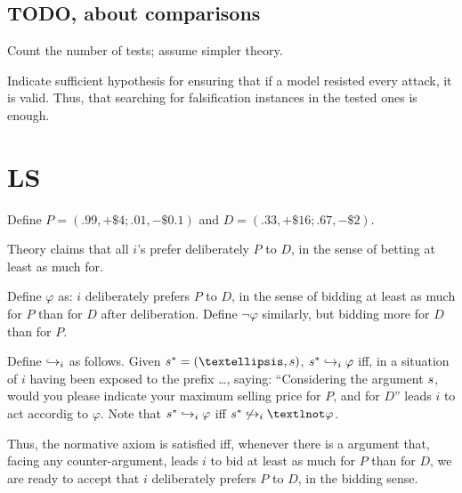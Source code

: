 \documentclass[version=last, pagesize, twoside=off, bibliography=totoc, DIV=calc, fontsize=12pt, a4paper, french, english]{scrartcl}
\renewcommand{\phi}{\varphi}%
\begin{document}
\subsection{TODO, about comparisons}
Count the number of tests; assume simpler theory.

Indicate sufficient hypothesis for ensuring that if a model resisted every attack, it is valid. Thus, that searching for falsification instances in the tested ones is enough.

\section{LS}
%
%
%
%
%
%
Define $P = (.99, +\$4; .01, −\$0.1)$ and $D = (.33, +\$16; .67, −\$2)$.

Theory claims that all $i$’s prefer deliberately $P$ to $D$, in the sense of betting at least as much for.

Define $\phi$ as: $i$ deliberately prefers $P$ to $D$, in the sense of bidding at least as much for $P$ than for $D$ after deliberation. Define $¬\phi$ similarly, but bidding more for $D$ than for $P$. 

Define $\hookrightarrow_i$ as follows. Given $\hist = (…, \ar)$, $\hist \ileadstost \phi$ iff, in a situation of $i$ having been exposed to the prefix …, saying: “Considering the argument $\ar$, would you please indicate your maximum selling price for $P$, and for $D$” leads $i$ to act accordig to $\phi$. Note that $\hist \ileadstost \phi$ iff $\hist \nileadstost ¬\phi$.

Thus, the normative axiom is satisfied iff, whenever there is a argument that, facing any counter-argument, leads $i$ to bid at least as much for $P$ than for $D$, we are ready to accept that $i$ deliberately prefers $P$ to $D$, in the bidding sense.
\end{document}
